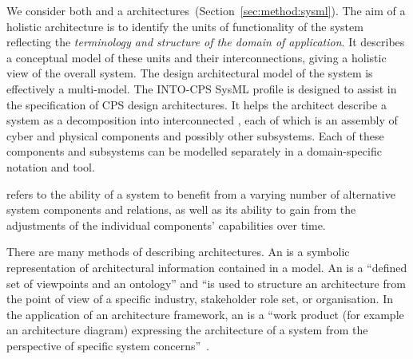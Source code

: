 We consider both  and a  architectures~(Section~\ref{sec:method:sysml}). The aim of a holistic architecture is to identify the units of functionality of the system reflecting the \emph{terminology and structure of the domain of application}. It describes a conceptual model of these units and their interconnections, giving a holistic view of the overall system. The design architectural model of the system is effectively a multi-model. The INTO-CPS SysML profile is designed to assist in the specification of CPS design architectures. It helps the architect describe a system as a decomposition into interconnected , each of which is an assembly of cyber and physical components and possibly other subsystems. Each of these components and subsystems can be modelled separately in a domain-specific notation and tool.

 refers to the ability of a system to benefit from a varying number of alternative system components and relations, as well as its ability to gain from the adjustments of the individual components' capabilities over time.

There are many methods of describing architectures. An  is a symbolic representation of architectural information contained in a model. An  is a ``defined set of viewpoints and an ontology'' and ``is used to structure an architecture from the point of view of a specific industry, stakeholder role set, or organisation. In the application of an architecture framework, an  is a ``work product (for example an architecture diagram) expressing the architecture of a system from the perspective of specific system concerns''~\cite{COMPASSD22.6}.


